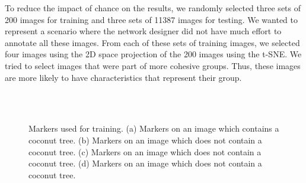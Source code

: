 \documentclass[a4paper,conference]{IEEEtran}
\begin{document}
To reduce the impact of chance on the results, we randomly selected three sets of 200 images for training and three sets of 11387 images for testing. We wanted to represent a scenario where the network designer did not have much effort to annotate all these images. From each of these sets of training images, we selected four images using the 2D space projection of the 200 images using the t-SNE. We tried to select images that were part of more cohesive groups. Thus, these images are more likely to have characteristics that represent their group.

\begin{figure}[!t]
    \centering
    ~
    \\
    ~
    \caption{Markers used for training. (a) Markers on an image which contains a coconut tree. (b) Markers on an image which does not contain a coconut tree. (c) Markers on an image which does not contain a coconut tree. (d) Markers on an image which does not contain a coconut tree.}
    \label{fig:markers}
\end{figure}
\end{document}
